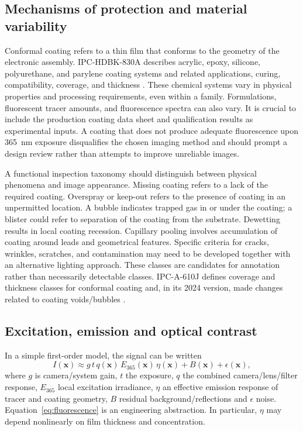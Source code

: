 \subsection{Mechanisms of protection and material variability}
Conformal coating refers to a thin film that conforms to the geometry of the electronic assembly. IPC-HDBK-830A describes acrylic, epoxy, silicone, polyurethane, and parylene coating systems and related applications, curing, compatibility, coverage, and thickness \citep{ipchdbk830a}. These chemical systems vary in physical properties and processing requirements, even within a family. Formulations, fluorescent tracer amounts, and fluorescence spectra can also vary. It is crucial to include the production coating data sheet and qualification results as experimental inputs. A coating that does not produce adequate fluorescence upon 365~nm exposure disqualifies the chosen imaging method and should prompt a design review rather than attempts to improve unreliable images.

A functional inspection taxonomy should distinguish between physical phenomena and image appearance. Missing coating refers to a lack of the required coating. Overspray or keep-out refers to the presence of coating in an unpermitted location. A bubble indicates trapped gas in or under the coating; a blister could refer to separation of the coating from the substrate. Dewetting results in local coating recession. Capillary pooling involves accumulation of coating around leads and geometrical features. Specific criteria for cracks, wrinkles, scratches, and contamination may need to be developed together with an alternative lighting approach. These classes are candidates for annotation rather than necessarily detectable classes. IPC-A-610J defines coverage and thickness classes for conformal coating and, in its 2024 version, made changes related to coating voids/bubbles \citep{ipca610j,ipc2024release}.

\subsection{Excitation, emission and optical contrast}
In a simple first-order model, the signal can be written
\begin{equation}
I(\mathbf{x}) \approx g\, t\, q(\mathbf{x})\,E_{365}(\mathbf{x})\,\eta(\mathbf{x}) + B(\mathbf{x}) + \epsilon(\mathbf{x}),
\label{eq:fluorescence}
\end{equation}
where $g$ is camera/system gain, $t$ the exposure, $q$ the combined camera/lens/filter response, $E_{365}$ local excitation irradiance, $\eta$ an effective emission response of tracer and coating geometry, $B$ residual background/reflections and $\epsilon$ noise. Equation~\ref{eq:fluorescence} is an engineering abstraction. In particular, $\eta$ may depend nonlinearly on film thickness and concentration.

